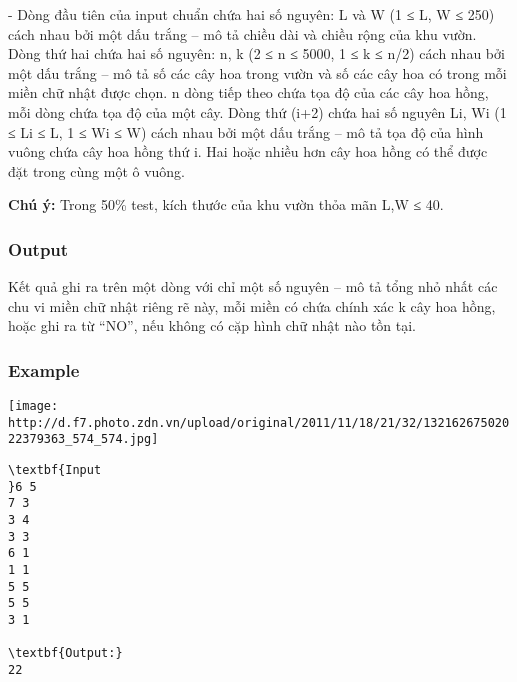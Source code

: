 - Dòng đầu tiên của input chuẩn chứa hai số nguyên: L và W (1 ≤ L, W ≤ 250) cách nhau bởi một dấu trắng – mô tả chiều dài và chiều rộng của khu vườn. Dòng thứ hai chứa hai số nguyên: n, k (2 ≤ n ≤ 5000, 1 ≤ k ≤ n/2) cách nhau bởi một dấu trắng – mô tả số các cây hoa trong vườn và số các cây hoa có trong mỗi miền chữ nhật được chọn. n dòng tiếp theo chứa tọa độ của các cây hoa hồng, mỗi dòng chứa tọa độ của một cây. Dòng thứ (i+2) chứa hai số nguyên Li, Wi (1 ≤ Li ≤ L, 1 ≤ Wi ≤ W) cách nhau bởi một dấu trắng – mô tả tọa độ của hình vuông chứa cây hoa hồng thứ i. Hai hoặc nhiều hơn cây hoa hồng có thể được đặt trong cùng một ô vuông.

\textbf{Chú ý: } Trong 50\% test, kích thước của khu vườn thỏa mãn L,W ≤ 40.

\subsubsection{Output}

Kết quả ghi ra trên một dòng với chỉ một số nguyên – mô tả tổng nhỏ nhất các chu vi miền chữ nhật riêng rẽ này, mỗi miền có chứa chính xác k cây hoa hồng, hoặc ghi ra từ “NO”, nếu không có cặp hình chữ nhật nào tồn tại.

\subsubsection{Example}


\texttt{[image: http://d.f7.photo.zdn.vn/upload/original/2011/11/18/21/32/13216267502022379363\_574\_574.jpg]}
\begin{verbatim}
\textbf{Input
}6 5 
7 3 
3 4 
3 3 
6 1 
1 1 
5 5 
5 5 
3 1

\textbf{Output:}
22
\end{verbatim}